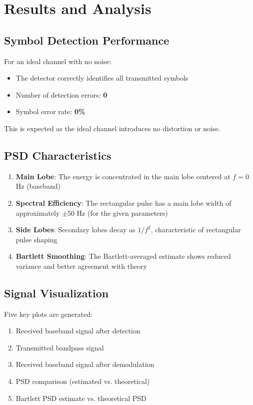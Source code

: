 \documentclass[12pt]{article}
\begin{document}
\section{Results and Analysis}

\subsection{Symbol Detection Performance}

For an ideal channel with no noise:
\begin{itemize}
    \item The detector correctly identifies all transmitted symbols
    \item Number of detection errors: \textbf{0}
    \item Symbol error rate: \textbf{0\%}
\end{itemize}

This is expected as the ideal channel introduces no distortion or noise.

\subsection{PSD Characteristics}

\begin{enumerate}
    \item \textbf{Main Lobe}: The energy is concentrated in the main lobe centered at $f = 0$ Hz (baseband)
    \item \textbf{Spectral Efficiency}: The rectangular pulse has a main lobe width of approximately $\pm 50$ Hz (for the given parameters)
    \item \textbf{Side Lobes}: Secondary lobes decay as $1/f^2$, characteristic of rectangular pulse shaping
    \item \textbf{Bartlett Smoothing}: The Bartlett-averaged estimate shows reduced variance and better agreement with theory
\end{enumerate}

\subsection{Signal Visualization}

Five key plots are generated:
\begin{enumerate}
    \item Received baseband signal after detection
    \item Transmitted bandpass signal
    \item Received baseband signal after demodulation
    \item PSD comparison (estimated vs. theoretical)
    \item Bartlett PSD estimate vs. theoretical PSD
\end{enumerate}
\end{document}
